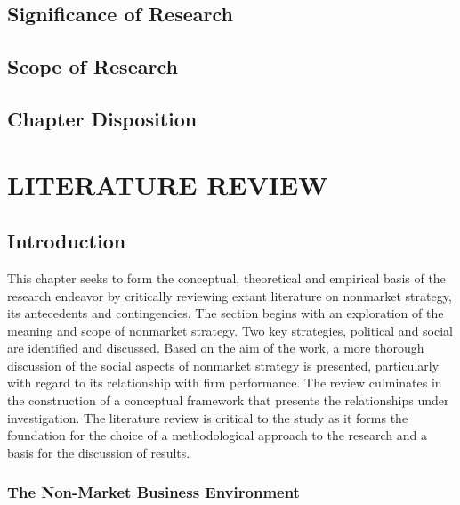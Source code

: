 \documentclass[
]{mitthesis}
\begin{document}
\hypertarget{significance-of-research}{%
\subsection{Significance of Research}\label{significance-of-research}}

\hypertarget{scope-of-research}{%
\subsection{Scope of Research}\label{scope-of-research}}

\hypertarget{chapter-disposition}{%
\subsection{Chapter Disposition}\label{chapter-disposition}}

\hypertarget{literature-review}{%
\section{LITERATURE REVIEW}\label{literature-review}}

\hypertarget{introduction}{%
\subsection{Introduction}\label{introduction}}

This chapter seeks to form the conceptual, theoretical and empirical basis of the research endeavor by critically reviewing extant literature on nonmarket strategy, its antecedents and contingencies. The section begins with an exploration of the meaning and scope of nonmarket strategy. Two key strategies, political and social are identified and discussed. Based on the aim of the work, a more thorough discussion of the social aspects of nonmarket strategy is presented, particularly with regard to its relationship with firm performance. The review culminates in the construction of a conceptual framework that presents the relationships under investigation. The literature review is critical to the study as it forms the foundation for the choice of a methodological approach to the research and a basis for the discussion of results.

\hypertarget{the-non-market-business-environment}{%
\subsubsection{The Non-Market Business Environment}\label{the-non-market-business-environment}}
\end{document}

